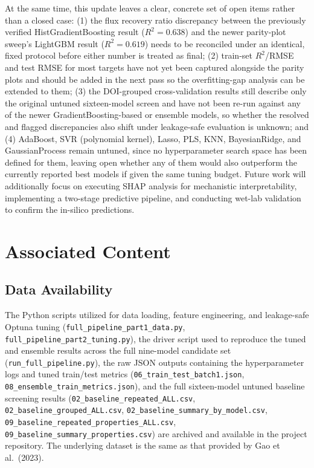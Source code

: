 \documentclass[11pt]{article}
\begin{document}
At the same time, this update leaves a clear, concrete set of open items rather than a closed case: (1) the flux recovery ratio discrepancy between the previously verified HistGradientBoosting result ($R^2=0.638$) and the newer parity-plot sweep's LightGBM result ($R^2=0.619$) needs to be reconciled under an identical, fixed protocol before either number is treated as final; (2) train-set $R^2$/RMSE and test RMSE for most targets have not yet been captured alongside the parity plots and should be added in the next pass so the overfitting-gap analysis can be extended to them; (3) the DOI-grouped cross-validation results still describe only the original untuned sixteen-model screen and have not been re-run against any of the newer GradientBoosting-based or ensemble models, so whether the resolved and flagged discrepancies also shift under leakage-safe evaluation is unknown; and (4) AdaBoost, SVR (polynomial kernel), Lasso, PLS, KNN, BayesianRidge, and GaussianProcess remain untuned, since no hyperparameter search space has been defined for them, leaving open whether any of them would also outperform the currently reported best models if given the same tuning budget. Future work will additionally focus on executing SHAP analysis for mechanistic interpretability, implementing a two-stage predictive pipeline, and conducting wet-lab validation to confirm the in-silico predictions.

\section*{Associated Content}

\subsection*{Data Availability}

The Python scripts utilized for data loading, feature engineering, and leakage-safe Optuna tuning (\texttt{full\_pipeline\_part1\_data.py}, \texttt{full\_pipeline\_part2\_tuning.py}), the driver script used to reproduce the tuned and ensemble results across the full nine-model candidate set (\texttt{run\_full\_pipeline.py}), the raw JSON outputs containing the hyperparameter logs and tuned train/test metrics (\texttt{06\_train\_test\_batch1.json}, \texttt{08\_ensemble\_train\_metrics.json}), and the full sixteen-model untuned baseline screening results (\texttt{02\_baseline\_repeated\_ALL.csv}, \texttt{02\_baseline\_grouped\_ALL.csv}, \texttt{02\_baseline\_summary\_by\_model.csv}, \texttt{09\_baseline\_repeated\_properties\_ALL.csv}, \texttt{09\_baseline\_summary\_properties.csv}) are archived and available in the project repository. The underlying dataset is the same as that provided by Gao et al.\ (2023).
\end{document}
